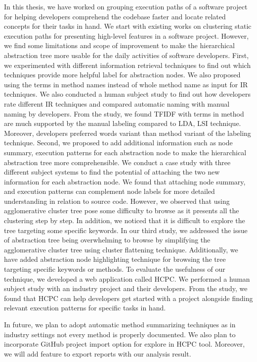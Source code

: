 \label{chapter:conclusion}
In this thesis, we have worked on grouping execution paths of a software project for helping developers comprehend the codebase faster and locate related concepts for their tasks in hand. We start with existing works on clustering static execution paths for presenting high-level features in a software project. However, we find some limitations and scope of improvement to make the hierarchical abstraction tree more usable for the daily activities of software developers. First, we experimented with different information retrieval techniques to find out which techniques provide more helpful label for abstraction nodes. We also proposed using the terms in method names instead of whole method name as input for IR techniques. We also conducted a human subject study to find out how developers rate different IR techniques and compared automatic naming with manual naming by developers. From the study, we found TFIDF with terms in method are much supported by the manual labeling compared to LDA, LSI technique. Moreover, developers preferred words variant than method variant of the labeling technique. Second, we proposed to add additional information such as node summary, execution patterns for each abstraction node to make the hierarchical abstraction tree more comprehensible. We conduct a case study with three different subject systems to find the potential of attaching the two new information for each abstraction node. We found that attaching node summary, and execution patterns can complement node labels for more detailed understanding in relation to source code. However, we observed that using agglomerative cluster tree pose some difficulty to browse as it presents all the clustering step by step. In addition, we noticed that it is difficult to explore the tree targeting some specific keywords. In our third study, we addressed the issue of abstraction tree being overwhelming to browse by simplifying the agglomerative cluster tree using cluster flattening technique. Additionally, we have added abstraction node highlighting technique for browsing the tree targeting specific keywords or methods. To evaluate the usefulness of our technique, we developed a web application called HCPC. We performed a human subject study with an industry project and their developers. From the study, we found that HCPC can help developers get started with a project alongside finding relevant execution patterns for specific tasks in hand.

In future, we plan to adopt automatic method summarizing techniques as in industry settings not every method is properly documented. We also plan to incorporate GitHub project import option for explore in HCPC tool. Moreover, we will add feature to export reports with our analysis result.